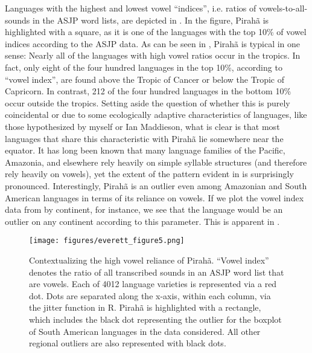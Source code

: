 \documentclass[output=paper,colorlinks,citecolor=brown
]{langscibook}
\begin{document}
    Languages with the highest and lowest vowel “indices”, i.e. ratios of vowels-to-all-sounds in the ASJP word lists, are depicted in . In the figure, Pirahã is highlighted with a square, as it is one of the languages with the top 10\% of vowel indices according to the ASJP data. As can be seen in , Pirahã is typical in one sense: Nearly all of the languages with high vowel ratios occur in the tropics. In fact, only eight of the four hundred languages in the top 10\%, according to “vowel index”, are found above the Tropic of Cancer or below the Tropic of Capricorn. In contrast, 212 of the four hundred languages in the bottom 10\% occur outside the tropics. Setting aside the question of whether this is purely coincidental or due to some ecologically adaptive characteristics of languages, like those hypothesized by myself or Ian Maddieson, what is clear is that most languages that share this characteristic with Pirahã lie somewhere near the equator. It has long been known that many language families of the Pacific, Amazonia, and elsewhere rely heavily on simple syllable structures (and therefore rely heavily on vowels), yet the extent of the pattern evident in  is surprisingly pronounced. Interestingly, Pirahã is an outlier even among Amazonian and South American languages in terms of its reliance on vowels. If we plot the vowel index data from  by continent, for instance, we see that the language would be an outlier on any continent according to this parameter. This is apparent in .

\begin{figure}
\centering
\texttt{[image: figures/everett\_figure5.png]}
\caption{\label{everett-figure-5}Contextualizing the high vowel reliance of Pirahã. “Vowel index” denotes the ratio of all transcribed sounds in an ASJP word list that are vowels. Each of 4012 language varieties is represented via a red dot. Dots are separated along the x-axis, within each column, via the jitter function in R. Pirahã is highlighted with a rectangle, which includes the black dot representing the outlier for the boxplot of South American languages in the data considered. All other regional outliers are also represented with black dots.}

\end{figure}
\end{document}
